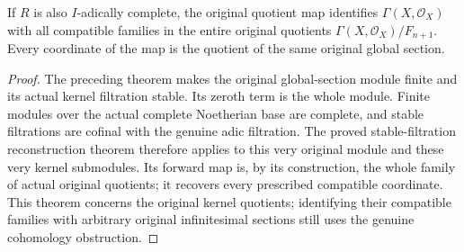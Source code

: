 \begin{theorem}
\label{thm:fibre-global-kernel-quotient-reconstruction}
\leanok
If $R$ is also $I$-adically complete, the original quotient map identifies
$\Gamma(X,\mathcal O_X)$ with all compatible families in the entire
original quotients $\Gamma(X,\mathcal O_X)/F_{n+1}$. Every coordinate
of the map is the quotient of the same original global section.
\end{theorem}
\begin{proof}
The preceding theorem makes the original global-section module finite
and its actual kernel filtration stable. Its zeroth term is the whole
module. Finite modules over the actual complete Noetherian base are
complete, and stable filtrations are cofinal with the genuine adic
filtration. The proved stable-filtration reconstruction theorem
therefore applies to this very original module and these very kernel
submodules. Its forward map is, by its construction, the whole family
of actual original quotients; it recovers every prescribed compatible
coordinate. This theorem concerns the original kernel quotients;
identifying their compatible families with arbitrary original
infinitesimal sections still uses the genuine cohomology obstruction.
\end{proof}
